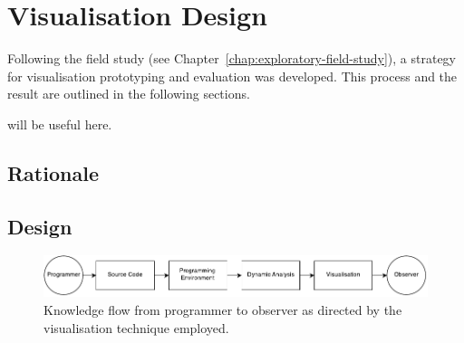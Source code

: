 
\chapter{Visualisation Design}
\label{chap:visualisation-design}

Following the field study (see Chapter~\ref{chap:exploratory-field-study}), a strategy for visualisation prototyping and evaluation was developed. This process and the result are outlined in the following sections.

{\color{red}\cite{Ware2013a,McLean2010a,Purchase1996} will be useful here.}



\section{Rationale}


\section{Design}

\begin{figure}
  \centering \includegraphics[width=\columnwidth]{../images/diagrams/knowledge-flow-initial.pdf}
  \caption{Knowledge flow from programmer to observer as directed by the visualisation technique employed.}
\label{fig:knowledge-flow-initial}
\end{figure}


